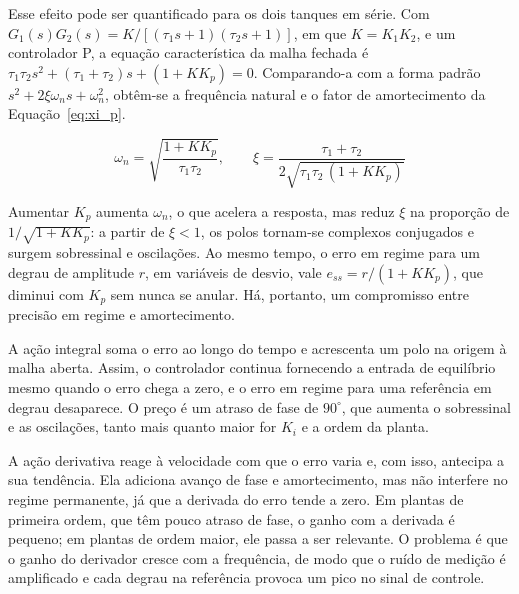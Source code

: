 \documentclass[a4paper,12pt]{article}
\begin{document}
\begin{justify}
    \hspace{4ex}Esse efeito pode ser quantificado para os dois tanques em série. Com $G_1(s)G_2(s) = K/[(\tau_1 s + 1)(\tau_2 s + 1)]$, em que $K = K_1 K_2$, e um controlador P, a equação característica da malha fechada é $\tau_1\tau_2 s^2 + (\tau_1 + \tau_2)s + (1 + K K_p) = 0$. Comparando-a com a forma padrão $s^2 + 2\xi\omega_n s + \omega_n^2$, obtêm-se a frequência natural e o fator de amortecimento da Equação~\eqref{eq:xi_p}.
\end{justify}

\begin{equation}
    \omega_n = \sqrt{\frac{1 + K K_p}{\tau_1 \tau_2}}, \qquad
    \xi = \frac{\tau_1 + \tau_2}{2\sqrt{\tau_1 \tau_2\,(1 + K K_p)}}
    \label{eq:xi_p}
\end{equation}

\begin{justify}
    \hspace{4ex}Aumentar $K_p$ aumenta $\omega_n$, o que acelera a resposta, mas reduz $\xi$ na proporção de $1/\sqrt{1 + K K_p}$: a partir de $\xi < 1$, os polos tornam-se complexos conjugados e surgem sobressinal e oscilações. Ao mesmo tempo, o erro em regime para um degrau de amplitude $r$, em variáveis de desvio, vale $e_{ss} = r/(1 + K K_p)$, que diminui com $K_p$ sem nunca se anular. Há, portanto, um compromisso entre precisão em regime e amortecimento.
\end{justify}

\begin{justify}
    \hspace{4ex}A ação integral soma o erro ao longo do tempo e acrescenta um polo na origem à malha aberta. Assim, o controlador continua fornecendo a entrada de equilíbrio mesmo quando o erro chega a zero, e o erro em regime para uma referência em degrau desaparece. O preço é um atraso de fase de $90^\circ$, que aumenta o sobressinal e as oscilações, tanto mais quanto maior for $K_i$ e a ordem da planta.
\end{justify}

\begin{justify}
    \hspace{4ex}A ação derivativa reage à velocidade com que o erro varia e, com isso, antecipa a sua tendência. Ela adiciona avanço de fase e amortecimento, mas não interfere no regime permanente, já que a derivada do erro tende a zero. Em plantas de primeira ordem, que têm pouco atraso de fase, o ganho com a derivada é pequeno; em plantas de ordem maior, ele passa a ser relevante. O problema é que o ganho do derivador cresce com a frequência, de modo que o ruído de medição é amplificado e cada degrau na referência provoca um pico no sinal de controle.
\end{justify}
\end{document}
